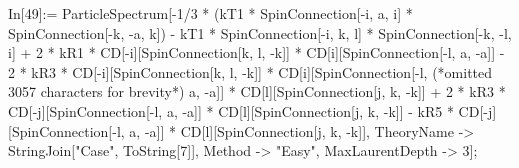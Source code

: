 In[49]:= ParticleSpectrum[-1/3 * (kT1 * SpinConnection[-i, a, i] * SpinConnection[-k, -a, k]) - kT1 * SpinConnection[-i, k, l] * SpinConnection[-k, -l, i] + 2 * kR1 * CD[-i][SpinConnection[k, l, -k]] * CD[i][SpinConnection[-l, a, -a]] - 2 * kR3 * CD[-i][SpinConnection[k, l, -k]] * CD[i][SpinConnection[-l, (*omitted 3057 characters for brevity*) a, -a]] * CD[l][SpinConnection[j, k, -k]] + 2 * kR3 * CD[-j][SpinConnection[-l, a, -a]] * CD[l][SpinConnection[j, k, -k]] - kR5 * CD[-j][SpinConnection[-l, a, -a]] * CD[l][SpinConnection[j, k, -k]], TheoryName -> StringJoin["Case", ToString[7]], Method -> "Easy", MaxLaurentDepth -> 3];